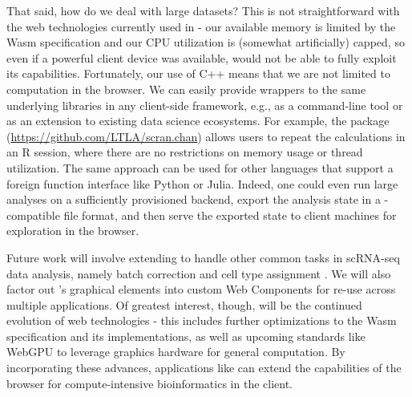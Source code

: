 \documentclass{article}
\begin{document}
That said, how do we deal with large datasets?
This is not straightforward with the web technologies currently used in  -
our available memory is limited by the Wasm specification and our CPU utilization is (somewhat artificially) capped,
so even if a powerful client device was available,  would not be able to fully exploit its capabilities.
Fortunately, our use of C++ means that we are not limited to computation in the browser.
We can easily provide wrappers to the same underlying libraries in any client-side framework, e.g., as a command-line tool or as an extension to existing data science ecosystems.
For example, the  package (\url{https://github.com/LTLA/scran.chan}) allows users to repeat the  calculations in an R session,
where there are no restrictions on memory usage or thread utilization.
The same approach can be used for other languages that support a foreign function interface like Python or Julia.
Indeed, one could even run large analyses on a sufficiently provisioned backend, 
export the analysis state in a -compatible file format,
and then serve the exported state to client machines for exploration in the browser. 

Future work will involve extending  to handle other common tasks in scRNA-seq data analysis,
namely batch correction \cite{haghverdi2018batch} and cell type assignment \cite{aran2019reference}.
We will also factor out 's graphical elements into custom Web Components for re-use across multiple applications. 
Of greatest interest, though, will be the continued evolution of web technologies -
this includes further optimizations to the Wasm specification and its implementations,
as well as upcoming standards like WebGPU to leverage graphics hardware for general computation.
By incorporating these advances, applications like  can extend the capabilities of the browser for compute-intensive bioinformatics in the client.



\end{document}
